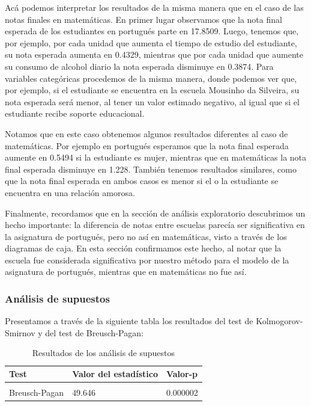 \documentclass[
]{article}
\begin{document}
Acá podemos interpretar los resultados de la misma manera que en el caso
de las notas finales en matemáticas. En primer lugar observamos que la
nota final esperada de los estudiantes en portugués parte en 17.8509.
Luego, tenemos que, por ejemplo, por cada unidad que aumenta el tiempo
de estudio del estudiante, su nota esperada aumenta en 0.4329, mientras
que por cada unidad que aumente su consumo de alcohol diario la nota
esperada disminuye en 0.3874. Para variables categóricas procedemos de
la misma manera, donde podemos ver que, por ejemplo, si el estudiante se
encuentra en la escuela Mousinho da Silveira, su nota esperada será
menor, al tener un valor estimado negativo, al igual que si el
estudiante recibe soporte educacional.

Notamos que en este caso obtenemos algunos resultados diferentes al caso
de matemáticas. Por ejemplo en portugués esperamos que la nota final
esperada aumente en 0.5494 si la estudiante es mujer, mientras que en
matemáticas la nota final esperada disminuye en 1.228. También tenemos
resultados similares, como que la nota final esperada en ambos casos es
menor si el o la estudiante se encuentra en una relación amorosa.

Finalmente, recordamos que en la sección de análisis exploratorio
descubrimos un hecho importante: la diferencia de notas entre escuelas
parecía ser significativa en la asignatura de portugués, pero no así en
matemáticas, visto a través de los diagramas de caja. En esta sección
confirmamos este hecho, al notar que la escuela fue considerada
significativa por nuestro método para el modelo de la asignatura de
portugués, mientras que en matemáticas no fue así.

\hypertarget{anuxe1lisis-de-supuestos-1}{%
\subsubsection{Análisis de supuestos}\label{anuxe1lisis-de-supuestos-1}}

Presentamos a través de la siguiente tabla los resultados del test de
Kolmogorov-Smirnov y del test de Breusch-Pagan:

\begin{longtable}[t]{lll}
\caption{\label{tab:resultados test por}Resultados de los análisis de supuestos}\\
\toprule
Test & Valor del estadístico & Valor-p\\
\midrule
\cellcolor{gray!6}{Kolmogorov-Smirnov} & \cellcolor{gray!6}{0.059992} & \cellcolor{gray!6}{0.018710}\\
Breusch-Pagan & 49.646 & 0.000002\\
\bottomrule
\end{longtable}
\end{document}
